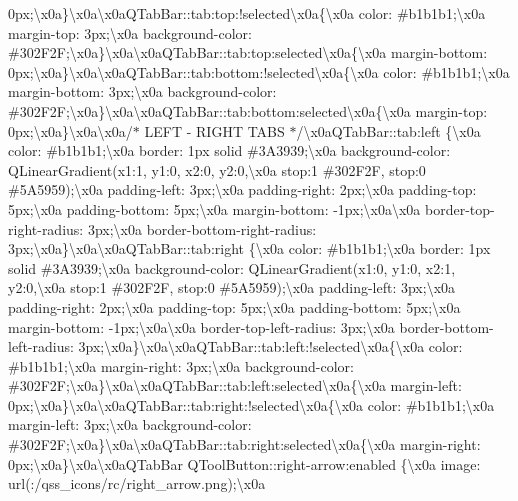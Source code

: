 0px;\textbackslash{}x0a\}\textbackslash{}x0a\textbackslash{}x0a\+Q\+Tab\+Bar\+::tab\+:top\+:!selected\textbackslash{}x0a\{\textbackslash{}x0a color\+: \#b1b1b1;\textbackslash{}x0a margin-\/top\+: 3px;\textbackslash{}x0a background-\/color\+: \#302\+F2\+F;\textbackslash{}x0a\}\textbackslash{}x0a\textbackslash{}x0a\+Q\+Tab\+Bar\+::tab\+:top\+:selected\textbackslash{}x0a\{\textbackslash{}x0a margin-\/bottom\+: 0px;\textbackslash{}x0a\}\textbackslash{}x0a\textbackslash{}x0a\+Q\+Tab\+Bar\+::tab\+:bottom\+:!selected\textbackslash{}x0a\{\textbackslash{}x0a color\+: \#b1b1b1;\textbackslash{}x0a margin-\/bottom\+: 3px;\textbackslash{}x0a background-\/color\+: \#302\+F2\+F;\textbackslash{}x0a\}\textbackslash{}x0a\textbackslash{}x0a\+Q\+Tab\+Bar\+::tab\+:bottom\+:selected\textbackslash{}x0a\{\textbackslash{}x0a margin-\/top\+: 0px;\textbackslash{}x0a\}\textbackslash{}x0a\textbackslash{}x0a/$\ast$ L\+E\+F\+T -\/ R\+I\+G\+H\+T T\+A\+B\+S $\ast$/\textbackslash{}x0a\+Q\+Tab\+Bar\+::tab\+:left \{\textbackslash{}x0a color\+: \#b1b1b1;\textbackslash{}x0a border\+: 1px solid \#3\+A3939;\textbackslash{}x0a background-\/color\+: Q\+Linear\+Gradient(x1\+:1, y1\+:0, x2\+:0, y2\+:0,\textbackslash{}x0a stop\+:1 \#302\+F2\+F, stop\+:0 \#5\+A5959);\textbackslash{}x0a padding-\/left\+: 3px;\textbackslash{}x0a padding-\/right\+: 2px;\textbackslash{}x0a padding-\/top\+: 5px;\textbackslash{}x0a padding-\/bottom\+: 5px;\textbackslash{}x0a margin-\/bottom\+: -\/1px;\textbackslash{}x0a\textbackslash{}x0a border-\/top-\/right-\/radius\+: 3px;\textbackslash{}x0a border-\/bottom-\/right-\/radius\+: 3px;\textbackslash{}x0a\}\textbackslash{}x0a\textbackslash{}x0a\+Q\+Tab\+Bar\+::tab\+:right \{\textbackslash{}x0a color\+: \#b1b1b1;\textbackslash{}x0a border\+: 1px solid \#3\+A3939;\textbackslash{}x0a background-\/color\+: Q\+Linear\+Gradient(x1\+:0, y1\+:0, x2\+:1, y2\+:0,\textbackslash{}x0a stop\+:1 \#302\+F2\+F, stop\+:0 \#5\+A5959);\textbackslash{}x0a padding-\/left\+: 3px;\textbackslash{}x0a padding-\/right\+: 2px;\textbackslash{}x0a padding-\/top\+: 5px;\textbackslash{}x0a padding-\/bottom\+: 5px;\textbackslash{}x0a margin-\/bottom\+: -\/1px;\textbackslash{}x0a\textbackslash{}x0a border-\/top-\/left-\/radius\+: 3px;\textbackslash{}x0a border-\/bottom-\/left-\/radius\+: 3px;\textbackslash{}x0a\}\textbackslash{}x0a\textbackslash{}x0a\+Q\+Tab\+Bar\+::tab\+:left\+:!selected\textbackslash{}x0a\{\textbackslash{}x0a color\+: \#b1b1b1;\textbackslash{}x0a margin-\/right\+: 3px;\textbackslash{}x0a background-\/color\+: \#302\+F2\+F;\textbackslash{}x0a\}\textbackslash{}x0a\textbackslash{}x0a\+Q\+Tab\+Bar\+::tab\+:left\+:selected\textbackslash{}x0a\{\textbackslash{}x0a margin-\/left\+: 0px;\textbackslash{}x0a\}\textbackslash{}x0a\textbackslash{}x0a\+Q\+Tab\+Bar\+::tab\+:right\+:!selected\textbackslash{}x0a\{\textbackslash{}x0a color\+: \#b1b1b1;\textbackslash{}x0a margin-\/left\+: 3px;\textbackslash{}x0a background-\/color\+: \#302\+F2\+F;\textbackslash{}x0a\}\textbackslash{}x0a\textbackslash{}x0a\+Q\+Tab\+Bar\+::tab\+:right\+:selected\textbackslash{}x0a\{\textbackslash{}x0a margin-\/right\+: 0px;\textbackslash{}x0a\}\textbackslash{}x0a\textbackslash{}x0a\+Q\+Tab\+Bar Q\+Tool\+Button\+::right-\/arrow\+:enabled \{\textbackslash{}x0a image\+: url(\+:/qss\+\_\+icons/rc/right\+\_\+arrow.\+png);\textbackslash{}x0a 
